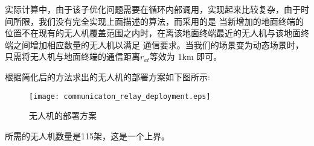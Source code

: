 实际计算中，由于该子优化问题需要在循环内部调用，实现起来比较复杂，由于时间所限，我们没有完全实现上面描述的算法，而采用的是
当新增加的地面终端的位置不在现有的无人机覆盖范围之内时，在离该地面终端最近的无人机与该地面终端之间增加相应数量的无人机以满足
通信要求。当我们的场景变为动态场景时，只需将无人机与地面终端的通信距离$r_{at}$等效为 1km 即可。

根据简化后的方法求出的无人机的部署方案如下图所示:
\begin{figure}[!ht]\label{fig:communicaton}
\centering
\texttt{[image: communicaton\_relay\_deployment.eps]}
\caption{无人机的部署方案}
\end{figure}

所需的无人机数量是115架，这是一个上界。
